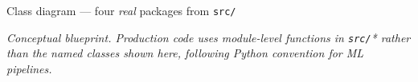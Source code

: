 \documentclass[aspectratio=169,10pt]{beamer}
\begin{document}
\begin{frame}{Class diagram --- four \emph{real} packages from \texttt{src/}}

  \vspace{0.2em}
  \scriptsize
  \emph{Conceptual blueprint. Production code uses module-level functions
  in \texttt{src/}* rather than the named classes shown here, following
  Python convention for ML pipelines.}
\end{frame}

\end{document}
